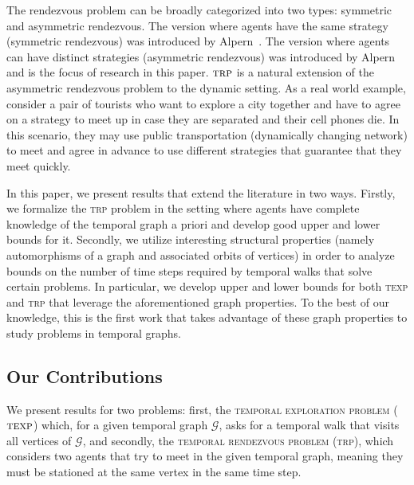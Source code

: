 \documentclass[10pt,a4paper]{article}
\newcommand{\trp}{\textsc{trp}}
\newcommand{\texp}{\textsc{texp}}
\begin{document}
The rendezvous problem can be broadly categorized into two types: symmetric and
asymmetric rendezvous. The version where agents have the same strategy
(symmetric rendezvous) was introduced by Alpern~\cite{Alpern76}. The version
where agents can have distinct strategies (asymmetric rendezvous) was introduced
by Alpern~\cite{Alpern95} and is the focus of research in this paper. 
$\trp$ is a natural
extension of the asymmetric rendezvous problem to the dynamic setting. As a real
world example, consider a pair of tourists who want to explore a city together
and have to agree on a strategy to meet up in case they are separated and their
cell phones die. In this scenario, they may use public transportation
(dynamically changing network) to meet and agree in advance to use different
strategies that guarantee that they meet quickly. 

In this paper, we present results that extend the literature in two ways.
Firstly, we formalize the \trp{} problem in the setting where agents have
complete knowledge of the temporal graph a priori and develop good upper and
lower bounds for it. 
Secondly, we
utilize interesting structural properties (namely automorphisms of a graph and
associated orbits of  vertices) in order to analyze 
bounds on the number of time steps required by temporal walks that solve certain problems.
In particular, we develop upper and lower bounds for both \texp{} and \trp{} that leverage the 
aforementioned graph properties. To the best of our knowledge, this is the first work that takes 
advantage of these graph properties to study problems in temporal graphs. 

\subsection{Our Contributions}
\label{subsec:our-contribs}
We present results for two problems: first, the \textsc{temporal exploration
problem} ($\texp$) which, for a given temporal graph $\mathcal{G}$, asks for a
temporal walk that visits all vertices of $\mathcal{G}$, and secondly, the
\textsc{temporal rendezvous problem} (\trp), which considers two agents that try
to meet in the given temporal graph, meaning they must be stationed at the same
vertex in the same time step.
\end{document}
